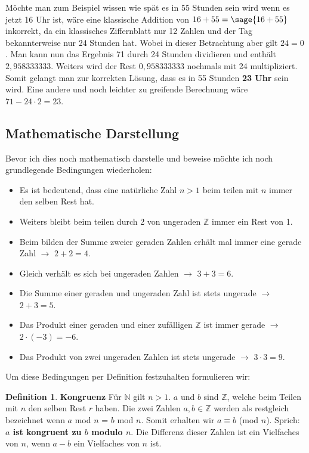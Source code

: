 \documentclass[12pt,a4paper]{article}
\theoremstyle{definition}
\newtheorem{defi}{Definition}[section]
\begin{document}
Möchte man zum Beispiel wissen wie spät es in 55 Stunden sein wird wenn es jetzt 16 Uhr ist, wäre eine klassische Addition von $16+55=\sage{16+55}$ inkorrekt, da ein klassisches Ziffernblatt nur 12 Zahlen und der Tag bekannterweise nur 24 Stunden hat.
Wobei in dieser Betrachtung aber gilt $24=0$.
Man kann nun das Ergebnis 71 durch 24 Stunden dividieren und enthält $2,958333333$.
Weiters wird der Rest $0,958333333$ nochmals mit 24 multipliziert.
Somit gelangt man zur korrekten Lösung, dass es in 55 Stunden \textbf{23 Uhr} sein wird.
Eine andere und noch leichter zu greifende Berechnung wäre $71 - 24 \cdot 2 = 23$.

\subsection{Mathematische Darstellung}\label{Mathematische Darstellung}
Bevor ich dies noch mathematisch darstelle und beweise möchte ich noch grundlegende Bedingungen wiederholen:
\begin{itemize}
    \item Es ist bedeutend, dass eine natürliche Zahl $n>1$ beim teilen mit $n$ immer den selben Rest hat.
    \item Weiters bleibt beim teilen durch 2 von ungeraden $\mathbb{Z}$ immer ein Rest von 1.
    \item Beim bilden der Summe zweier geraden Zahlen erhält mal immer eine gerade Zahl $\rightarrow$ $2+2=4$.
    \item Gleich verhält es sich bei ungeraden Zahlen $\rightarrow$ $3+3=6$.
    \item Die Summe einer geraden und ungeraden Zahl ist stets ungerade $\rightarrow$ $2+3=5$.
    \item Das Produkt einer geraden und einer zufälligen $\mathbb{Z}$ ist immer gerade $\rightarrow$ $2 \cdot (-3) = -6$.
    \item Das Produkt von zwei ungeraden Zahlen ist stets ungerade $\rightarrow$ $3 \cdot 3 = 9$.
\end{itemize}

Um diese Bedingungen per Definition festzuhalten formulieren wir:
\begin{defi}\textbf{Kongruenz} Für $\mathbb{N}$ gilt $n>1$.
$a$ und $b$ sind $\mathbb{Z}$, welche beim Teilen mit $n$ den selben Rest $r$ haben.
Die zwei Zahlen $a, b \in \mathbb{Z}$ werden als restgleich bezeichnet wenn $a$ mod $n$ = $b$ mod $n$.
Somit erhalten wir $a\equiv b$ (mod $n$). Sprich: \textbf{$a$ ist kongruent zu $b$ modulo $n$}.
Die Differenz dieser Zahlen ist ein Vielfaches von $n$, wenn $a-b$ ein Vielfaches von $n$ ist.
\end{defi}
\end{document}
